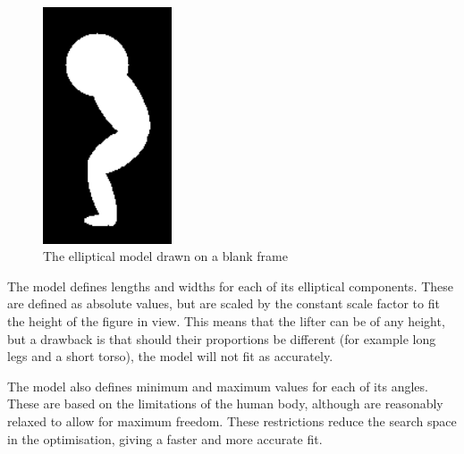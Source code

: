 \begin{figure}[H]
    \centering
	\includegraphics[height=7cm]{algorithm/images/model_drawn}
\caption{The elliptical model drawn on a blank frame}
\label{fig:modeldrawn}
\end{figure}

The model defines lengths and widths for each of its elliptical components. These are defined as absolute values, but are scaled by the constant scale factor to fit the height of the figure in view. This means that the lifter can be of any height, but a drawback is that should their proportions be different (for example long legs and a short torso), the model will not fit as accurately.

The model also defines minimum and maximum values for each of its angles. These are based on the limitations of the human body, although are reasonably relaxed to allow for maximum freedom. These restrictions reduce the search space in the optimisation, giving a faster and more accurate fit.

